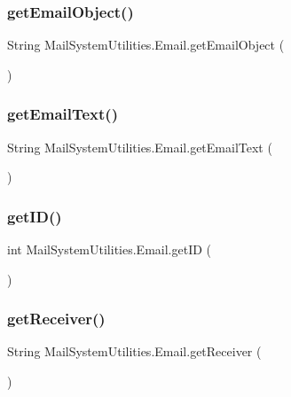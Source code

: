 \subsubsection{get\+Email\+Object()}
{\footnotesize\ttfamily String Mail\+System\+Utilities.\+Email.\+get\+Email\+Object (\begin{DoxyParamCaption}{ }\end{DoxyParamCaption})}

\mbox{\label{class_mail_system_utilities_1_1_email_afb5c1fa6f76c3b82a8b38b3163a8b58a}} 
\subsubsection{get\+Email\+Text()}
{\footnotesize\ttfamily String Mail\+System\+Utilities.\+Email.\+get\+Email\+Text (\begin{DoxyParamCaption}{ }\end{DoxyParamCaption})}

\mbox{\label{class_mail_system_utilities_1_1_email_a30038ac74a18d1e0cbf1889d25b8fb2e}} 
\subsubsection{get\+I\+D()}
{\footnotesize\ttfamily int Mail\+System\+Utilities.\+Email.\+get\+ID (\begin{DoxyParamCaption}{ }\end{DoxyParamCaption})}

\mbox{\label{class_mail_system_utilities_1_1_email_a8d8f44421e292e599c825970783cba92}} 
\subsubsection{get\+Receiver()}
{\footnotesize\ttfamily String Mail\+System\+Utilities.\+Email.\+get\+Receiver (\begin{DoxyParamCaption}{ }\end{DoxyParamCaption})}

